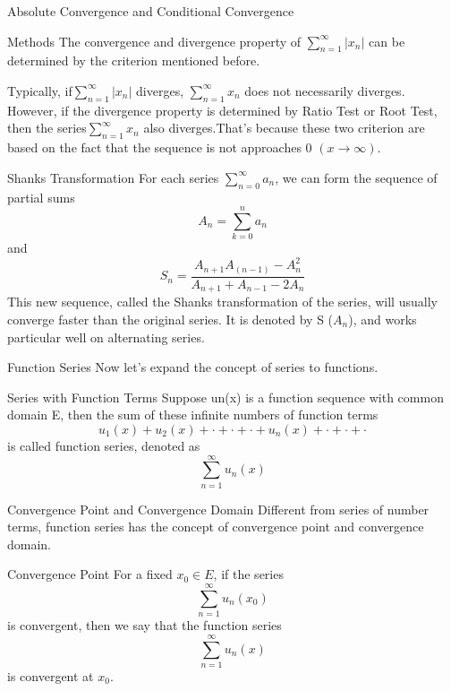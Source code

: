 \begin{frame}{Absolute Convergence and Conditional Convergence}
    \begin{block}{Methods}
        The convergence and divergence property of $\sum_{n=1}^{\infty} |x_n|$ can be determined by the criterion mentioned before.
    \end{block}
    Typically, if$\sum_{n=1}^{\infty} |x_n|$ diverges, $\sum_{n=1}^{\infty} x_n$ does not necessarily diverges. \\However, if the divergence property is determined by Ratio Test or Root Test, then the series$\sum_{n=1}^{\infty} x_n$ also diverges.That’s because these two criterion are based on the fact that the sequence is not approaches 0 $(x \rightarrow \infty)$.
\end{frame}



\begin{frame}{Shanks Transformation}
    For each series $\sum_{n=0}^{\infty} a_n$, we can form the sequence of partial sums
    $$A_n= \sum \limits _{k=0}^{n} a_n$$
    and
    $$S_n=\frac{A_{n+1}A_(n-1)-A_n^2}{A_{n+1}+A_{n-1}-2A_n}$$
    This new sequence, called the Shanks transformation of the series, will usually converge faster than the original series. It is denoted by S ($A_n$), and works particular well on alternating series.
\end{frame}


\begin{frame}{Function Series}
    Now let’s expand the concept of series to functions.
    \begin{block}{Series with Function Terms}
        Suppose un(x) is a function sequence with common domain E, then the sum of these infinite numbers of function terms $$u_1(x)+u_2(x)+\cdot+\cdot+\cdot+u_n(x)+\cdot+\cdot+\cdot$$ is called function series, denoted as $$\sum\limits_{n=1}^{\infty}u_n(x)$$
    \end{block}
\end{frame}



\begin{frame}{Convergence Point and Convergence Domain}
    Different from series of number terms, function series has the concept of convergence point and convergence domain.
    \begin{block}{Convergence Point}
        For a fixed $x_0 \in E$, if the series $$\sum\limits_{n=1}^{\infty}u_n(x_0)$$is convergent, then we say that the function series $$\sum\limits_{n=1}^{\infty}u_n(x)$$ is convergent at $x_0$.
    \end{block}
\end{frame}


